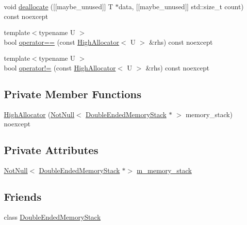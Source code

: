 \begin{DoxyCompactItemize}
\item 
void \mbox{\hyperlink{classmage_1_1_double_ended_memory_stack_1_1_high_allocator_a02e7f1138ae4919822760f0420fc7b10}{deallocate}} (\mbox{[}\mbox{[}maybe\+\_\+unused\mbox{]}\mbox{]} T $\ast$data, \mbox{[}\mbox{[}maybe\+\_\+unused\mbox{]}\mbox{]} std\+::size\+\_\+t count) const noexcept
\item 
{\footnotesize template$<$typename U $>$ }\\bool \mbox{\hyperlink{classmage_1_1_double_ended_memory_stack_1_1_high_allocator_afb9cebad6705d90479185c6a7932c657}{operator==}} (const \mbox{\hyperlink{classmage_1_1_double_ended_memory_stack_1_1_high_allocator}{High\+Allocator}}$<$ U $>$ \&rhs) const noexcept
\item 
{\footnotesize template$<$typename U $>$ }\\bool \mbox{\hyperlink{classmage_1_1_double_ended_memory_stack_1_1_high_allocator_a4e6823ef7853c905a99f2f59847aeea0}{operator!=}} (const \mbox{\hyperlink{classmage_1_1_double_ended_memory_stack_1_1_high_allocator}{High\+Allocator}}$<$ U $>$ \&rhs) const noexcept
\end{DoxyCompactItemize}
\subsection*{Private Member Functions}
\begin{DoxyCompactItemize}
\item 
\mbox{\hyperlink{classmage_1_1_double_ended_memory_stack_1_1_high_allocator_a4be3d4cac75c3bd8088d47c0ec06cf11}{High\+Allocator}} (\mbox{\hyperlink{namespacemage_a8769f9d670d6b585ea306cb1062af94b}{Not\+Null}}$<$ \mbox{\hyperlink{classmage_1_1_double_ended_memory_stack}{Double\+Ended\+Memory\+Stack}} $\ast$ $>$ memory\+\_\+stack) noexcept
\end{DoxyCompactItemize}
\subsection*{Private Attributes}
\begin{DoxyCompactItemize}
\item 
\mbox{\hyperlink{namespacemage_a8769f9d670d6b585ea306cb1062af94b}{Not\+Null}}$<$ \mbox{\hyperlink{classmage_1_1_double_ended_memory_stack}{Double\+Ended\+Memory\+Stack}} $\ast$$>$ \mbox{\hyperlink{classmage_1_1_double_ended_memory_stack_1_1_high_allocator_a12f884e51fa8115f25eb0cc869d2d7a0}{m\+\_\+memory\+\_\+stack}}
\end{DoxyCompactItemize}
\subsection*{Friends}
\begin{DoxyCompactItemize}
\item 
class \mbox{\hyperlink{classmage_1_1_double_ended_memory_stack_1_1_high_allocator_a10ae729d55b8c0017057250445835680}{Double\+Ended\+Memory\+Stack}}
\end{DoxyCompactItemize}



